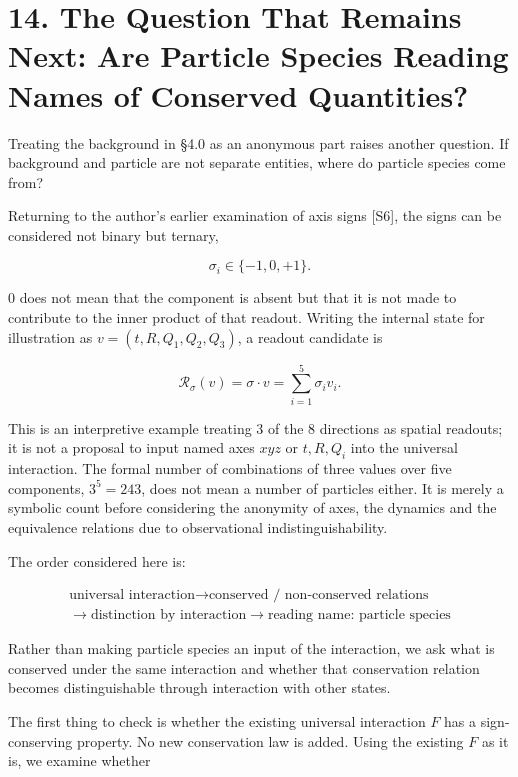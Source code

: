 \documentclass[
  a4paper,
]{article}
\begin{document}
\section{14. The Question That Remains Next: Are Particle Species
Reading Names of Conserved
Quantities?}\label{the-question-that-remains-next-are-particle-species-reading-names-of-conserved-quantities}

Treating the background in §4.0 as an anonymous part raises another
question. If background and particle are not separate entities, where do
particle species come from?

Returning to the author's earlier examination of axis signs {[}S6{]},
the signs can be considered not binary but ternary,

\[
\sigma_i\in\{-1,0,+1\}.
\]

\(0\) does not mean that the component is absent but that it is not made
to contribute to the inner product of that readout. Writing the internal
state for illustration as \(v=(t,R,Q_1,Q_2,Q_3)\), a readout candidate
is

\[
\mathcal R_\sigma(v)=\sigma\cdot v=\sum_{i=1}^{5}\sigma_iv_i.
\]

This is an interpretive example treating 3 of the 8 directions as
spatial readouts; it is not a proposal to input named axes \(xyz\) or
\(t,R,Q_i\) into the universal interaction. The formal number of
combinations of three values over five components, \(3^5=243\), does not
mean a number of particles either. It is merely a symbolic count before
considering the anonymity of axes, the dynamics and the equivalence
relations due to observational indistinguishability.

The order considered here is:

\[
\boxed{\begin{array}{c}
\text{universal interaction}
\longrightarrow
\text{conserved / non-conserved relations}
\\
\longrightarrow
\text{distinction by interaction}
\longrightarrow
\text{reading name: particle species}
\end{array}}
\]

Rather than making particle species an input of the interaction, we ask
what is conserved under the same interaction and whether that
conservation relation becomes distinguishable through interaction with
other states.

The first thing to check is whether the existing universal interaction
\(F\) has a sign-conserving property. No new conservation law is added.
Using the existing \(F\) as it is, we examine whether
\end{document}
